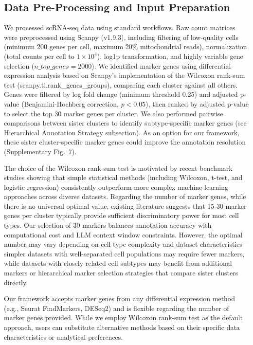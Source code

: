 \documentclass[pdflatex,sn-nature]{sn-jnl}%
\theoremstyle{thmstyleone}%
\theoremstyle{thmstyletwo}%
\theoremstyle{thmstylethree}%
\begin{document}
\subsection{Data Pre-Processing and Input Preparation}
We processed scRNA-seq data using standard workflows. Raw count matrices were preprocessed using Scanpy\cite{wolfSCANPYLargescaleSinglecell2018} (v1.9.3), including filtering of low-quality cells (minimum 200 genes per cell, maximum 20\% mitochondrial reads), normalization (total counts per cell to $1 \times 10^4$), log1p transformation, and highly variable gene selection ($n\_top\_genes=2000$). We identified marker genes using differential expression analysis based on Scanpy's implementation of the Wilcoxon rank-sum test (scanpy.tl.rank\_genes\_groups), comparing each cluster against all others. Genes were filtered by log fold change (minimum threshold 0.25) and adjusted p-value (Benjamini-Hochberg correction, $p < 0.05$), then ranked by adjusted p-value to select the top 30 marker genes per cluster. We also performed pairwise comparisons between sister clusters to identify subtype-specific marker genes (see Hierarchical Annotation Strategy subsection). As an option for our framework, these sister cluster-specific marker genes could improve the annotation resolution (Supplementary Fig.~7).

The choice of the Wilcoxon rank-sum test is motivated by recent benchmark studies showing that simple statistical methods (including Wilcoxon, t-test, and logistic regression) consistently outperform more complex machine learning approaches across diverse datasets\cite{soneson2018bias}. Regarding the number of marker genes, while there is no universal optimal value, existing literature suggests that 15-30 marker genes per cluster typically provide sufficient discriminatory power for most cell types\cite{dumitrascu2021optimal}. Our selection of 30 markers balances annotation accuracy with computational cost and LLM context window constraints. However, the optimal number may vary depending on cell type complexity and dataset characteristics—simpler datasets with well-separated cell populations may require fewer markers, while datasets with closely related cell subtypes may benefit from additional markers or hierarchical marker selection strategies that compare sister clusters directly.

Our framework accepts marker genes from any differential expression method (e.g., Seurat FindMarkers, DESeq2) and is flexible regarding the number of marker genes provided. While we employ Wilcoxon rank-sum test as the default approach, users can substitute alternative methods based on their specific data characteristics or analytical preferences.
\end{document}
